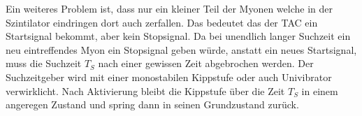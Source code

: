 Ein weiteres Problem ist, dass nur ein kleiner Teil der Myonen welche in der Szintilator eindringen dort auch zerfallen.
Das bedeutet das der TAC ein Startsignal bekommt, aber kein Stopsignal.
Da bei unendlich langer Suchzeit ein neu eintreffendes Myon ein Stopsignal geben würde, anstatt ein neues Startsignal,
muss die Suchzeit $T_S$ nach einer gewissen Zeit abgebrochen werden.
Der Suchzeitgeber wird mit einer monostabilen Kippstufe oder auch Univibrator verwirklicht.
Nach Aktivierung bleibt die Kippstufe über die Zeit $T_S$ in einem angeregen Zustand und spring dann in seinen Grundzustand zurück.
